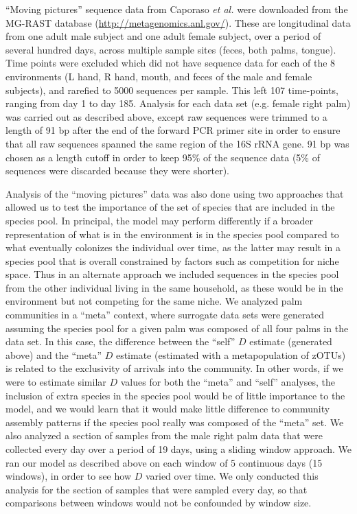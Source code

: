 \documentclass{article}
\begin{document}
\par
“Moving pictures” sequence data from Caporaso \emph{et al.} \cite{Caporaso2011} were downloaded from the MG-RAST database (\url{http://metagenomics.anl.gov/}). These are longitudinal data from one adult male subject and one adult female subject, over a period of several hundred days, across multiple sample sites (feces, both palms, tongue). Time points were excluded which did not have sequence data for each of the 8 environments (L hand, R hand, mouth, and feces of the male and female subjects), and rarefied to 5000 sequences per sample. This left 107 time-points, ranging from day 1 to day 185. Analysis for each data set (e.g. female right palm) was carried out as described above, except raw sequences were trimmed to a length of 91 bp after the end of the forward PCR primer site in order to ensure that all raw sequences spanned the same region of the 16S rRNA gene. 91 bp was chosen as a length cutoff in order to keep 95\% of the sequence data (5\% of sequences were discarded because they were shorter).
\par
Analysis of the “moving pictures” data was also done using two approaches that allowed us to test the importance of the set of species that are included in the species pool. In principal, the model may perform differently if a broader representation of what is in the environment is in the species pool compared to what eventually colonizes the individual over time, as the latter may result in a species pool that is overall constrained by factors such as competition for niche space. Thus in an alternate approach we included sequences in the species pool from the other individual living in the same household, as these would be in the environment but not competing for the same niche. We analyzed palm communities in a “meta” context, where surrogate data sets were generated assuming the species pool for a given palm was composed of all four palms in the data set. In this case, the difference between the “self” \(D\) estimate (generated above) and the “meta” \(D\) estimate (estimated with a metapopulation of zOTUs) is related to the exclusivity of arrivals into the community. In other words, if we were to estimate similar \(D\) values for both the “meta” and “self” analyses, the inclusion of extra species in the species pool would be of little importance to the model, and we would learn that it would make little difference to community assembly patterns if the species pool really was composed of the “meta” set. We also analyzed a section of samples from the male right palm data that were collected every day over a period of 19 days, using a sliding window approach. We ran our model as described above on each window of 5 continuous days (15 windows), in order to see how \(D\) varied over time. We only conducted this analysis for the section of samples that were sampled every day, so that comparisons between windows would not be confounded by window size.
\end{document}
